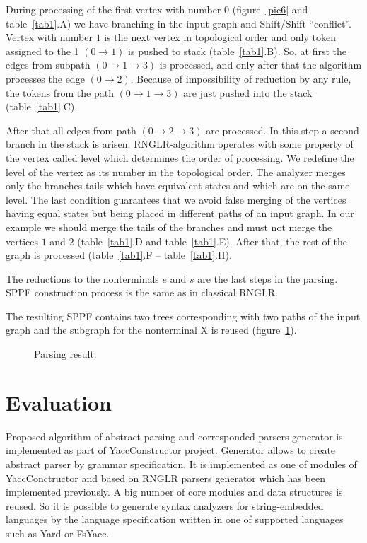 \documentclass{acm_proc_article-sp}
\begin{document}
During processing of the first vertex with number 0 (figure~\ref{pic6} and table~\ref{tab1}.A) we have branching in the input graph and  Shift/Shift ``conflict''. Vertex with number $1$ is the next vertex in topological order and only token  assigned to the 1 $(0 \rightarrow 1)$ is pushed to stack (table~\ref{tab1}.B). So, at first the edges from subpath $(0 \rightarrow 1 \rightarrow 3)$ is processed, and only after that the algorithm processes the edge $(0 \rightarrow 2)$. Because of impossibility of reduction by any rule, the tokens from the path $(0 \rightarrow 1 \rightarrow 3)$ are just pushed into the stack (table~\ref{tab1}.C).


After that all edges from path $(0 \rightarrow 2 \rightarrow 3)$ are processed. In this step a second branch in the stack is arisen. RNGLR-algorithm operates with some property of the vertex called level which determines the order of processing. We redefine the level of the vertex as its number in the topological order. The analyzer merges only the branches tails which have equivalent states and which are on the same level. The last condition guarantees that we avoid false merging of the vertices having equal states but being placed in different paths of an input graph. In our example we should merge the tails of the branches and must not merge the vertices $1$ and $2$ (table~\ref{tab1}.D and table~\ref{tab1}.E). After that, the rest of the graph is processed (table~\ref{tab1}.F -- table~\ref{tab1}.H).


The reductions to the nonterminals $e$ and $s$ are the last steps in the parsing. SPPF construction process is the same as in classical RNGLR.

The resulting SPPF contains two trees corresponding with two paths of the input graph and the subgraph for the nonterminal X is reused (figure~\ref{pic7}).

\begin{figure}
    \centering

    \caption{Parsing result.}
    \label{pic7}
\end{figure}

\section{Evaluation}

Proposed algorithm of abstract parsing and corresponded parsers generator is implemented as part of YaccConstructor project. Generator allows to create abstract parser by grammar specification. It is implemented as one of modules of YaccConctructor and based on RNGLR parsers generator which  has been implemented previously. A big number of core modules and data structures is reused. So it is possible to generate syntax analyzers for string-embedded languages by the language specification written in one of supported languages such as Yard or FsYacc.
\end{document}
